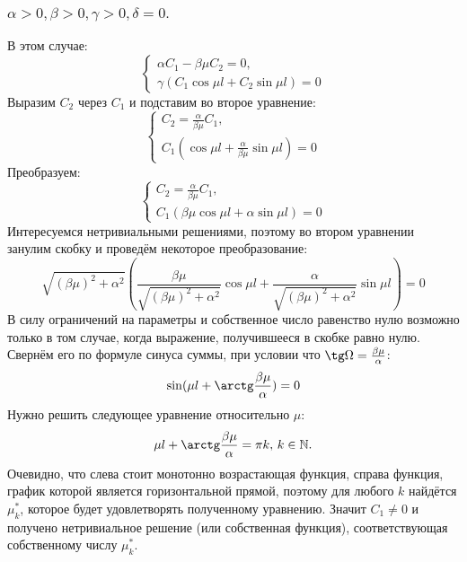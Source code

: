 \documentclass[12pt, a4paper]{article}
\begin{document}
\subsubsection{ $ \alpha > 0, \beta > 0, \gamma > 0, \delta = 0. $}
В этом случае:
\begin{displaymath}
	\begin{cases}
		\alpha C_{1} - \beta \mu C_{2} = 0, \\
		\gamma (C_{1} \cos \mu l + C_{2} \sin \mu l) = 0
	\end{cases}
\end{displaymath}
Выразим $C_{2}$ через $C_{1}$ и подставим во второе уравнение:
\begin{displaymath}
	\begin{cases}
		C_{2} = \frac{\alpha}{\beta \mu} C_{1}, \\
		C_{1} (\cos \mu l + \frac{\alpha}{\beta \mu} \sin \mu l) = 0
	\end{cases}
\end{displaymath}
Преобразуем:
\begin{displaymath}
	\begin{cases}
		C_{2} = \frac{\alpha}{\beta \mu} C_{1}, \\
		C_{1} (\beta \mu \cos \mu l + \alpha \sin \mu l) = 0
	\end{cases}
\end{displaymath}
Интересуемся нетривиальными решениями, поэтому во втором уравнении занулим скобку и проведём некоторое преобразование:
\[ \sqrt{(\beta \mu)^2 + \alpha^2} (\frac{\beta \mu}{\sqrt{(\beta \mu)^2 + \alpha^2}} \cos \mu l + \frac{\alpha}{\sqrt{(\beta \mu)^2 + \alpha^2}} \sin \mu l) = 0 \]
В силу ограничений на параметры и собственное число равенство нулю возможно только в том случае, когда выражение, получившееся в скобке равно нулю. Свернём его по формуле синуса суммы, при условии что $\tg \Omega = \frac{\beta \mu}{\alpha}$:
\[ \sin (\mu l + \arctg \frac{\beta \mu}{\alpha}) = 0 \]
Нужно решить следующее уравнение относительно $\mu$:
\[ \mu l + \arctg \frac{\beta \mu}{\alpha} = \pi k, \, k \in \mathbb{N}. \]
Очевидно, что слева стоит монотонно возрастающая функция, справа функция, график которой является горизонтальной прямой, поэтому для любого $k$ найдётся $\mu ^{*}_{k}$, которое будет удовлетворять полученному уравнению. Значит $C_{1} \ne 0$ и получено нетривиальное решение (или собственная функция), соответствующая собственному числу $\mu ^{*}_{k}$.
\end{document}
